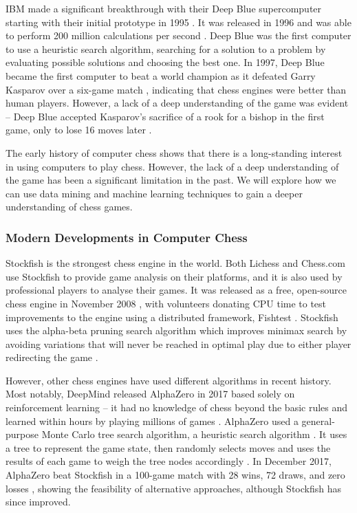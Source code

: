 \documentclass[a4paper, 11pt]{article}
\begin{document}
IBM made a significant breakthrough with their Deep Blue supercomputer starting with their initial prototype in 1995 \cite{hsu1995deep}. It was released in 1996 \cite{hsu1999ibm} and was able to perform 200 million calculations per second \cite{strogatz2018one}. Deep Blue was the first computer to use a heuristic search algorithm, searching for a solution to a problem by evaluating possible solutions and choosing the best one. In 1997, Deep Blue became the first computer to beat a world champion as it defeated Garry Kasparov over a six-game match \cite{seirawan1997implications}, indicating that chess engines were better than human players. However, a lack of a deep understanding of the game was evident -- Deep Blue accepted Kasparov's sacrifice of a rook for a bishop in the first game, only to lose 16 moves later \cite{strogatz2018one}.

The early history of computer chess shows that there is a long-standing interest in using computers to play chess. However, the lack of a deep understanding of the game has been a significant limitation in the past. We will explore how we can use data mining and machine learning techniques to gain a deeper understanding of chess games.

\subsubsection{Modern Developments in Computer Chess}
Stockfish is the strongest chess engine in the world. Both Lichess and Chess.com use Stockfish to provide game analysis on their platforms, and it is also used by professional players to analyse their games. It was released as a free, open-source chess engine in November 2008 \cite{aboutStockfish}, with volunteers donating CPU time to test improvements to the engine using a distributed framework, Fishtest \cite{fishtestDistributedTestingFramework}. Stockfish uses the alpha-beta pruning search algorithm which improves minimax search \cite{v1928theorie} by avoiding variations that will never be reached in optimal play due to either player redirecting the game \cite{maharaj2022chess}.

However, other chess engines have used different algorithms in recent history. Most notably, DeepMind released AlphaZero in 2017 \cite{silver2017mastering2} based solely on reinforcement learning -- it had no knowledge of chess beyond the basic rules and learned within hours by playing millions of games \cite{strogatz2018one}. AlphaZero used a general-purpose Monte Carlo tree search algorithm, a heuristic search algorithm \cite{silver2017mastering2}. It uses a tree to represent the game state, then randomly selects moves and uses the results of each game to weigh the tree nodes accordingly \cite{chaslot2008monte}. In December 2017, AlphaZero beat Stockfish in a 100-game match with 28 wins, 72 draws, and zero losses \cite{klein2017google}, showing the feasibility of alternative approaches, although Stockfish has since improved.
\end{document}
